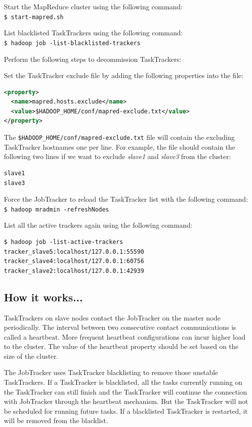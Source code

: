 Start the MapReduce cluster using the following command: \\
\verb|$ start-mapred.sh|

List blacklisted TaskTrackers using the following command: \\
\verb|$ hadoop job -list-blacklisted-trackers|

Perform the following steps to decommission TaskTrackers: 

Set the TaskTracker exclude file by adding the following properties into the file:
\lstset{style=bashstyle}
\begin{lstlisting}[language=XML]
<property>
  <name>mapred.hosts.exclude</name>
  <value>$HADOOP_HOME/conf/mapred-exclude.txt</value>
</property>
\end{lstlisting}

The \verb|$HADOOP_HOME/conf/mapred-exclude.txt| file will contain the excluding TaskTracker hostnames one per line. For example, the file should contain the following two lines if we want to exclude \emph{slave1} and \emph{slave3} from the cluster: 
\lstset{style=bashstyle}
\begin{lstlisting}
slave1
slave3
\end{lstlisting}

Force the JobTracker to reload the TaskTracker list with the following command: \\
\verb|$ hadoop mradmin -refreshNodes|

List all the active trackers again using the following command:
\lstset{style=bashstyle}
\begin{lstlisting}
$ hadoop job -list-active-trackers
tracker_slave5:localhost/127.0.0.1:55590
tracker_slave4:localhost/127.0.0.1:60756
tracker_slave2:localhost/127.0.0.1:42939
\end{lstlisting}

\subsection*{How it works...}
TaskTrackers on slave nodes contact the JobTracker on the master node periodically. The interval between two consecutive contact communications is called a heartbeat. More frequent heartbeat configurations can incur higher load to the cluster. The value of the heartbeat property should be set based on the size of the cluster.

The JobTracker uses TaskTracker blacklisting to remove those unstable TaskTrackers. If a TaskTracker is blacklisted, all the tasks currently running on the TaskTracker can still finish and the TaskTracker will continue the connection with JobTracker through the heartbeat mechanism. But the TaskTracker will not be scheduled for running future tasks. If a blacklisted TaskTracker is restarted, it will be removed from the blacklist.


